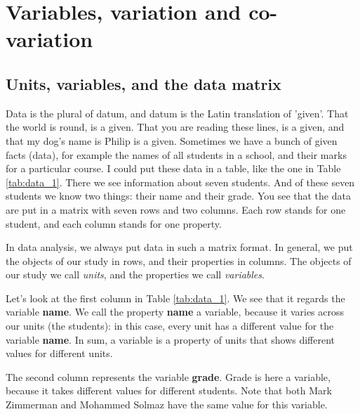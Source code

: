 \chapter{Variables, variation and co-variation} \label{chap:intro}



\section{Units, variables, and the data matrix}





Data is the plural of datum, and datum is the Latin translation of 'given'. That the world is round, is a given. That you are reading these lines, is a given, and that my dog's name is Philip is a given. Sometimes we have a bunch of given facts (data), for example the names of all students in a school, and their marks for a particular course. I could put these data in a table, like the one in Table \ref{tab:data_1}. There we see information about seven students. And of these seven students we know two things: their name and their grade. You see that the data are put in a matrix with seven rows and two columns. Each row stands for one student, and each column stands for one property.

In data analysis, we always put data in such a matrix format. In general, we put the objects of our study in rows, and their properties in columns. The objects of our study we call \textit{units}, and the properties we call \textit{variables}.

\begin{kframe}


{\ttfamily\noindent\bfseries{}}\end{kframe}

Let's look at the first column in Table \ref{tab:data_1}. We see that it regards the variable \textbf{name}. We call the property \textbf{name} a variable, because it varies across our units (the students): in this case, every unit has a different value for the variable \textbf{name}. In sum, a variable is a property of units that shows different values for different units.

The second column represents the variable \textbf{grade}. Grade is here a variable, because it takes different values for different students. Note that both Mark Zimmerman and Mohammed Solmaz have the same value for this variable.

